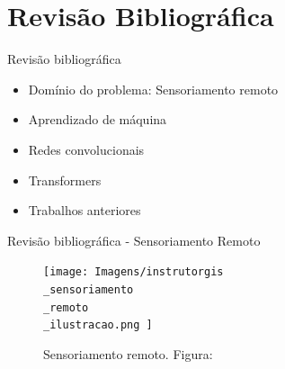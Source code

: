 \documentclass[8pt]{beamer}
\begin{document}
\section{Revisão Bibliográfica} 
\begin{frame}{Revisão bibliográfica }
\begin{itemize}
    \item Domínio do problema: Sensoriamento remoto
    \item Aprendizado de máquina
    \item Redes convolucionais
    \item Transformers
    \item Trabalhos anteriores
\end{itemize}

\end{frame}


\begin{frame}{Revisão bibliográfica - Sensoriamento Remoto}
    \begin{figure}[!ht]
        \centering
        \texttt{[image: 
            Imagens/instrutorgis\\\_sensoriamento\\\_remoto\\\_ilustracao.png
        ]}
        \caption{Sensoriamento remoto. Figura:\cite{InstrutorGIS}}
    \label{fig:sensoriamento}
    \end{figure}
    \end{frame}
\end{document}
